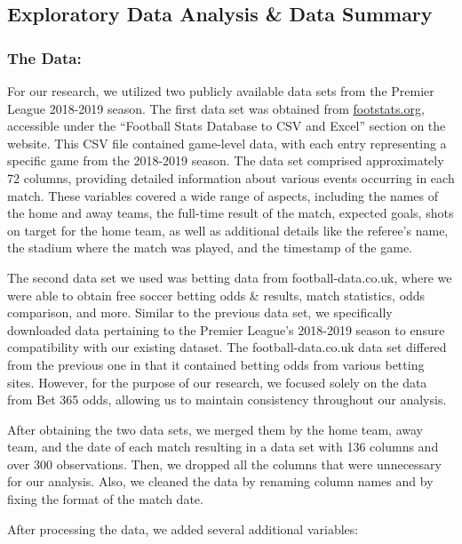 \documentclass[
]{article}
\begin{document}
\hypertarget{exploratory-data-analysis-data-summary}{%
\subsection{Exploratory Data Analysis \& Data
Summary}\label{exploratory-data-analysis-data-summary}}

\hypertarget{the-data}{%
\subsubsection{The Data:}\label{the-data}}

For our research, we utilized two publicly available data sets from the
Premier League 2018-2019 season. The first data set was obtained from
\url{footstats.org}, accessible under the ``Football Stats Database to
CSV and Excel'' section on the website. This CSV file contained
game-level data, with each entry representing a specific game from the
2018-2019 season. The data set comprised approximately 72 columns,
providing detailed information about various events occurring in each
match. These variables covered a wide range of aspects, including the
names of the home and away teams, the full-time result of the match,
expected goals, shots on target for the home team, as well as additional
details like the referee's name, the stadium where the match was played,
and the timestamp of the game.

The second data set we used was betting data from football-data.co.uk,
where we were able to obtain free soccer betting odds \& results, match
statistics, odds comparison, and more. Similar to the previous data set,
we specifically downloaded data pertaining to the Premier League's
2018-2019 season to ensure compatibility with our existing dataset. The
football-data.co.uk data set differed from the previous one in that it
contained betting odds from various betting sites. However, for the
purpose of our research, we focused solely on the data from Bet 365
odds, allowing us to maintain consistency throughout our analysis.

After obtaining the two data sets, we merged them by the home team, away
team, and the date of each match resulting in a data set with 136
columns and over 300 observations. Then, we dropped all the columns that
were unnecessary for our analysis. Also, we cleaned the data by renaming
column names and by fixing the format of the match date.

After processing the data, we added several additional variables:
\end{document}
